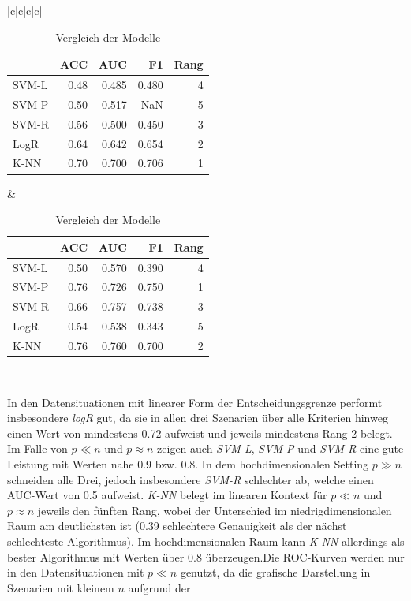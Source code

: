 \documentclass[
]{article}
\begin{document}
{\begin{landscape}
\begin{table}[h]
\begin{tabular}{|c|c|c|c|}
\begin{tabular}{lrrrr}
\toprule
  & ACC & AUC & F1 & Rang\\
\midrule
SVM-L & 0.48 & 0.485 & 0.480 & 4\\
SVM-P & 0.50 & 0.517 & NaN & 5\\
SVM-R & 0.56 & 0.500 & 0.450 & 3\\
LogR & 0.64 & 0.642 & 0.654 & 2\\
K-NN & 0.70 & 0.700 & 0.706 & 1\\
\bottomrule
\end{tabular}  &  
\begin{tabular}{lrrrr}
\toprule
  & ACC & AUC & F1 & Rang\\
\midrule
SVM-L & 0.50 & 0.570 & 0.390 & 4\\
SVM-P & 0.76 & 0.726 & 0.750 & 1\\
SVM-R & 0.66 & 0.757 & 0.738 & 3\\
LogR & 0.54 & 0.538 & 0.343 & 5\\
K-NN & 0.76 & 0.760 & 0.700 & 2\\
\bottomrule
\end{tabular}  \\ \hline \end{tabular} \caption{Vergleich der Modelle} \label{tab:TabVergleich} \end{table}

\end{landscape}
\clearpage
} In den Datensituationen mit linearer Form der Entscheidungsgrenze
performt insbesondere \textit{logR} gut, da sie in allen drei Szenarien
über alle Kriterien hinweg einen Wert von mindestens 0.72 aufweist und
jeweils mindestens Rang 2 belegt. Im Falle von \(p \ll n\) und
\(p \approx n\) zeigen auch \textit{SVM-L}, \textit{SVM-P} und
\textit{SVM-R} eine gute Leistung mit Werten nahe 0.9 bzw. 0.8. In dem
hochdimensionalen Setting \(p \gg n\) schneiden alle Drei, jedoch
insbesondere \textit{SVM-R} schlechter ab, welche einen AUC-Wert von 0.5
aufweist. \textit{K-NN} belegt im linearen Kontext für \(p \ll n\) und
\(p \approx n\) jeweils den fünften Rang, wobei der Unterschied im
niedrigdimensionalen Raum am deutlichsten ist (0.39 schlechtere
Genauigkeit als der nächst schlechteste Algorithmus). Im
hochdimensionalen Raum kann \textit{K-NN} allerdings als bester
Algorithmus mit Werten über 0.8 überzeugen.\newline Die ROC-Kurven
werden nur in den Datensituationen mit \(p \ll n\) genutzt, da die
grafische Darstellung in Szenarien mit kleinem \(n\) aufgrund der
\end{document}
